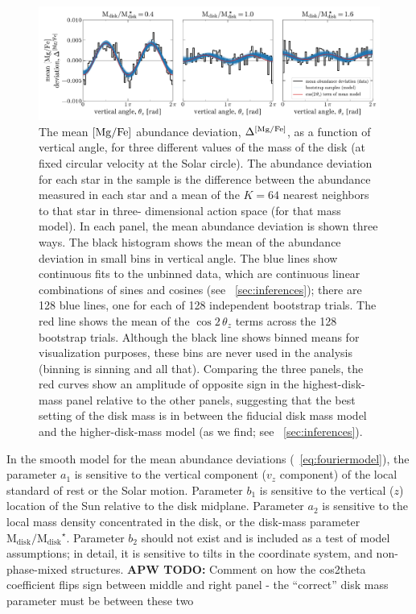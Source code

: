 \documentclass[modern]{aastex63}
\newcommand{\mdisk}{\ensuremath{\mathrm{M}_\mathrm{disk}}}
\newcommand{\mratio}{\ensuremath{\mdisk / \mdisk^\star}}
\newcommand{\APWTODO}[1]{{\color{tabpurple}\textbf{APW TODO:} #1}}
\begin{document}
\begin{figure}[!tp] %
  \begin{center}
  \includegraphics[width=\textwidth]{sinusoid-fits.pdf}
  \end{center}
  \caption{%
    The mean ${[\mathrm{Mg}/\mathrm{Fe}]}$ abundance deviation, $\Delta^{{[\mathrm{Mg}/\mathrm{Fe}]}}$, as a
    function of vertical angle, for three different values of the mass of the
    disk (at fixed circular velocity at the Solar circle).
    The abundance deviation for each star in the sample is the difference
    between the abundance measured in each star and a mean of the $K=64$ nearest
    neighbors to that star in three- dimensional action space (for that mass
    model).
    In each panel, the mean abundance deviation is shown three ways.
    The black histogram shows the mean of the abundance deviation in small bins
    in vertical angle.
    The blue lines show continuous fits to the unbinned data, which are
    continuous linear combinations of sines and cosines (see
    \sectionname~\ref{sec:inferences}); there are 128 blue lines, one for each
    of 128 independent bootstrap trials.
    The red line shows the mean of the $\cos 2\,\theta_z$ terms across the
    128 bootstrap trials.
    Although the black line shows binned means for visualization purposes,
    these bins are never used in the analysis (binning is sinning and all that).
    Comparing the three panels, the red curves show an amplitude of opposite
    sign in the highest-disk-mass panel relative to the other panels, suggesting
    that the best setting of the disk mass is in between the fiducial disk mass
    model and the higher-disk-mass model (as we find; see
    \sectionname~\ref{sec:inferences}).
  \label{fig:sinusoid-fits}
  }
\end{figure}

In the smooth model for the mean abundance deviations
(\equationname~\ref{eq:fouriermodel}), the parameter $a_1$ is sensitive to the
vertical component ($v_z$ component) of the local standard of rest or the Solar
motion.
Parameter $b_1$ is sensitive to the vertical ($z$) location of the Sun relative
to the disk midplane.
Parameter $a_2$ is sensitive to the local mass density concentrated in the disk,
or the disk-mass parameter \mratio.
Parameter $b_2$ should not exist and is included as a test of model assumptions;
in detail, it is sensitive to tilts in the coordinate system, and
non-phase-mixed structures.
\APWTODO{Comment on how the cos2theta coefficient flips sign between middle and
right panel - the ``correct'' disk mass parameter must be between these two}
\end{document}
